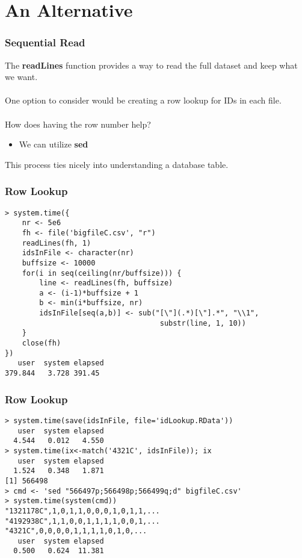 \documentclass{beamer}
\begin{document}
\section{An Alternative}

\begin{frame}
\frametitle{Sequential Read}
The \textbf{readLines} function provides a way to read the full dataset and keep what we want.\\~\\

One option to consider would be creating a row lookup for IDs in each file.\\~\\

How does having the row number help?
    \begin{itemize}
    \item We can utilize \textbf{sed}
    \end{itemize}

This process ties nicely into understanding a database table.
\end{frame}

\begin{frame}[fragile=singleslide]
\frametitle{Row Lookup}
\begin{verbatim}
> system.time({
    nr <- 5e6
    fh <- file('bigfileC.csv', "r")
    readLines(fh, 1)
    idsInFile <- character(nr)
    buffsize <- 10000
    for(i in seq(ceiling(nr/buffsize))) {
        line <- readLines(fh, buffsize)
        a <- (i-1)*buffsize + 1
        b <- min(i*buffsize, nr)
        idsInFile[seq(a,b)] <- sub("[\"](.*)[\"].*", "\\1",
                                    substr(line, 1, 10))
    }
    close(fh)
})
   user  system elapsed 
379.844   3.728 391.45
\end{verbatim}
\end{frame}

\begin{frame}[fragile=singleslide]
\frametitle{Row Lookup}
\begin{verbatim}
> system.time(save(idsInFile, file='idLookup.RData'))
   user  system elapsed 
  4.544   0.012   4.550
> system.time(ix<-match('4321C', idsInFile)); ix
   user  system elapsed 
  1.524   0.348   1.871 
[1] 566498
> cmd <- 'sed "566497p;566498p;566499q;d" bigfileC.csv'
> system.time(system(cmd))
"1321178C",1,0,1,1,0,0,0,1,0,1,1,...
"4192938C",1,1,0,0,1,1,1,1,0,0,1,...
"4321C",0,0,0,0,1,1,1,1,0,1,0,...
   user  system elapsed 
  0.500   0.624  11.381 
\end{verbatim}
\end{frame}
\end{document}
